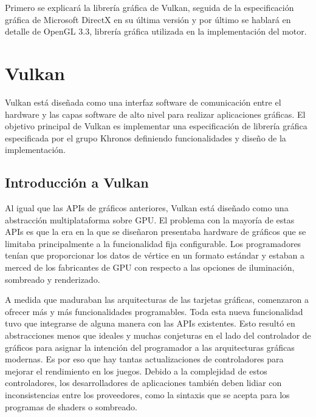 \documentclass[a4paper, 17pt]{book}
\begin{document}
\vspace{1mm} %

Primero se explicará la librería gráfica de Vulkan, seguida de la especificación gráfica de Microsoft DirectX en su última
versión y por último se hablará en detalle de OpenGL 3.3, librería gráfica utilizada en la implementación del motor.

\section{Vulkan} 
\label{sec:Vulkan}

Vulkan está diseñada como una interfaz software de comunicación entre el hardware y las capas software de alto nivel para
realizar aplicaciones gráficas. El objetivo principal de Vulkan es implementar una especificación de librería gráfica
especificada por el grupo Khronos definiendo funcionalidades y diseño de la implementación.

\subsection{Introducción a Vulkan} 
\label{subsec:IntroVulkan}

Al igual que las APIs de gráficos anteriores, Vulkan está diseñado como una abstracción multiplataforma sobre GPU.
El problema con la mayoría de estas APIs es que la era en la que se diseñaron presentaba hardware de gráficos que se
limitaba principalmente a la funcionalidad fija configurable. Los programadores tenían que proporcionar los datos de
vértice en un formato estándar y estaban a merced de los fabricantes de GPU con respecto a las opciones de iluminación,
sombreado y renderizado.

\vspace{1mm} %

A medida que maduraban las arquitecturas de las tarjetas gráficas, comenzaron a ofrecer más y más funcionalidades
programables. Toda esta nueva funcionalidad tuvo que integrarse de alguna manera con las APIs existentes. Esto resultó
en abstracciones menos que ideales y muchas conjeturas en el lado del controlador de gráficos para asignar la intención
del programador a las arquitecturas gráficas modernas. Es por eso que hay tantas actualizaciones de controladores para
mejorar el rendimiento en los juegos. Debido a la complejidad de estos controladores, los desarrolladores de aplicaciones
también deben lidiar con inconsistencias entre los proveedores, como la sintaxis que se acepta para los programas de
shaders o sombreado. 
\end{document}
